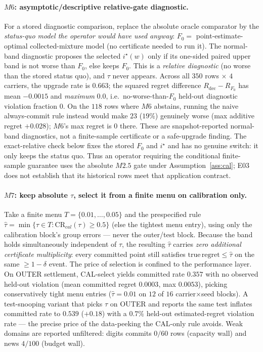 \documentclass{article}
\begin{document}
\paragraph{$M6$: asymptotic/descriptive relative-gate diagnostic.}
For a stored diagnostic comparison, replace the absolute oracle comparator by the
\emph{status-quo model the operator would have used anyway}:
$F_0 = $ point-estimate-optimal collected-mixture model (no certificate needed to run it).
The normal-band diagnostic proposes the selected $i^\star(w)$ only if its one-sided paired
upper band is not worse than $F_0$, else keeps $F_0$. This is a \emph{relative diagnostic}
(no worse than the stored status quo), and $\tau$ never appears. Across all
$350$ rows $\times$ $4$ carriers, the upgrade rate is $0.663$; the squared regret
difference $R_{\mathrm{dec}}-R_{F_0}$ has mean $-0.0015$ and \emph{maximum} $0.0$, i.e.\
no-worse-than-$F_0$ held-out diagnostic violation fraction $0$. On the $118$ rows where $M6$ abstains, running the
naive always-commit rule instead would make $23$ ($19\%$) genuinely worse
(max additive regret $+0.028$); $M6$'s max regret is $0$ there. These are
snapshot-reported normal-band diagnostics, not a finite-sample certificate or a safe-upgrade
finding. The exact-relative check below fixes the stored $F_0$ and $i^\star$ and has no
genuine switch: it only keeps the status quo. Thus an operator requiring the conditional
finite-sample guarantee uses the absolute $M2.5$ gate under Assumption~\ref{ass:cal}; E03
does not establish that its historical rows meet that application contract.

\paragraph{$M7$: keep absolute $\tau$, select it from a finite menu on calibration only.}
Take a finite menu $T=\{0.01,\dots,0.05\}$ and the prespecified rule
$\hat\tau=\min\{\tau\in T:\mathrm{CR}_{cal}(\tau)\ge0.5\}$ (else the tightest menu entry),
using only the calibration block's group errors --- never the outer/test block. Because the
band holds simultaneously independent of $\tau$, the resulting $\hat\tau$ carries \emph{zero
additional certificate multiplicity}: every committed point still satisfies
$\mathrm{true\,regret}\le\hat\tau$ on the same $\ge1-\delta$ event. The price of selection
is confined to the performance layer. On OUTER settlement, CAL-select yields committed rate
$0.357$ with no observed held-out violation (mean committed regret $0.0003$, max $0.0053$), picking
conservatively tight menu entries ($\hat\tau{=}0.01$ on $12$ of $16$ carrier$\times$seed
blocks). A test-snooping variant that picks $\tau$ on OUTER and reports the same test
inflates committed rate to $0.539$ ($+0.18$) with a $0.7\%$ held-out estimated-regret
violation rate --- the
precise price of the data-peeking the CAL-only rule avoids. Weak domains are reported
unfiltered: digits commits $0/60$ rows (capacity wall) and news $4/100$ (budget wall).
\end{document}

